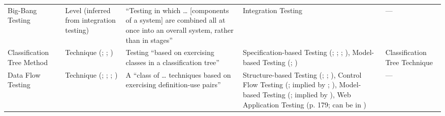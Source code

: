 \begin{table}[hbtp!]
\begin{tabularx}{\linewidth}{|m{1.7cm}|m{4.2cm}|X|m{7.7cm}|m{2.8cm}|}
        Big-Bang Testing           & Level (inferred from integration testing)                                                                                      & ``Testing in which \dots{} [components of a system] are combined all at once into an overall system, rather than in stages'' \citep[p.~45]{IEEE2017} & Integration Testing \citetext{\citealp[p.~45]{IEEE2017}; \citealp[p.~5-7]{SWEBOK2024}; \citealp[p.~603]{SharmaEtAl2021}; \citealp[p.~42]{Kam2008}}                                                                                                                                                                                                                                                                     & ---                                           \\[1cm]
        Classification Tree Method & Technique (\citealp[p.~22]{IEEE2022}; \citeyear[pp.~2,~12,~Fig.~2]{IEEE2021}; \citealpISTQB{})                                 & Testing ``based on exercising classes in a classification tree'' \citep[p.~22]{IEEE2021}                                                             & Specification-based Testing (\citealp[p.~22]{IEEE2022}; \citeyear[pp.~2,~12,~Fig.~2]{IEEE2021}; \citealpISTQB{}; \citealp[p.~47]{Firesmith2015}), Model-based Testing (\citealp[p.~13]{IEEE2022}; \citeyear[pp.~6,~12]{IEEE2021})                                                                                                                                                                                      & Classification Tree Technique \citepISTQB{}   \\[1.5cm] %
        Data Flow Testing          & Technique (\citealp[p.~22]{IEEE2022}; \citeyear[pp.~3,~27]{IEEE2021}; \citealp[p.~5-13]{SWEBOK2024}; \citealp[p.~43]{Kam2008}) & A ``class of \dots{} techniques based on exercising definition-use pairs'' \citep[p.~3; similar on p.~27]{IEEE2021}                                  & Structure-based Testing (\citealp[p.~22]{IEEE2022}; \citeyear[pp.~3,~27,~Fig.~2]{IEEE2021}; \citealp[p.~43]{Kam2008}), Control Flow Testing (\citeyear[p.~27]{IEEE2021}; implied by \citealp[p.~5-13]{SWEBOK2024}; \citealp[p.~101]{IEEE2017}), Model-based Testing (\citeyear[p.~27]{IEEE2021}; implied by \citealp[p.~179]{DoğanEtAl2014}), Web Application Testing (p. 179; can be in \citealp[pp.~16-17]{Kam2008}) & ---                                           \\
        \hline
    \end{tabularx}
\end{table}